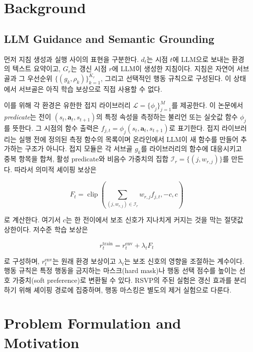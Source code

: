 \section{Background}

\subsection{LLM Guidance and Semantic Grounding}

먼저 지침 생성과 실행 사이의 표현을 구분한다. $d_t$는 시점 $t$에 LLM으로 보내는
환경의 텍스트 요약이고, $G_r$는 갱신 시점 $r$에 LLM이 생성한 지침이다. 지침은
자연어 서브골과 그 우선순위 $\{(g_k,\rho_k)\}_{k=1}^{K_r}$, 그리고 선택적인 행동
규칙으로 구성된다. 이 상태에서 서브골은 아직 학습 보상으로 직접 사용할 수 없다.

이를 위해 각 환경은 유한한 접지 라이브러리
$\mathcal L=\{\phi_j\}_{j=1}^{M}$를 제공한다. 이 논문에서 \emph{predicate}는
전이 $(s_t,\mathbf a_t,s_{t+1})$의 특정 속성을 측정하는 불리언 또는 실숫값 함수
$\phi_j$를 뜻한다. 그 시점의 함수 출력은
$f_{j,t}=\phi_j(s_t,\mathbf a_t,s_{t+1})$로 표기한다. 접지 라이브러리는 실행 전에
정의된 측정 함수의 목록이며 온라인에서 LLM이 새 함수를 만들어 추가하는 구조가 아니다.
접지 모듈은 각 서브골 $g_k$를 라이브러리의 함수에 대응시키고 중복 항목을
합쳐, 활성 predicate와 비음수 가중치의 집합
$\mathcal I_r=\{(j,w_{r,j})\}$를 만든다. 따라서 의미적 셰이핑 보상은

\begin{equation}
F_t=\operatorname{clip}\!\left(
  \sum_{(j,w_{r,j})\in\mathcal I_r}w_{r,j} f_{j,t},-c,c
\right)
\label{eq:shaping}
\end{equation}

로 계산한다. 여기서 $c$는 한 전이에서 보조 신호가 지나치게 커지는 것을 막는
절댓값 상한이다. 저수준 학습 보상은

\begin{equation}
r_t^{\mathrm{train}}=r_t^{\mathrm{env}}+\lambda_tF_t
\label{eq:reward}
\end{equation}

로 구성하며, $r_t^{\mathrm{env}}$는 원래 환경 보상이고 $\lambda_t$는 보조 신호의
영향을 조절하는 계수이다. 행동 규칙은 특정 행동을 금지하는 마스크(hard mask)나
행동 선택 점수를 높이는 선호 가중치(soft preference)로 변환될 수 있다. RSVP의
주된 실험은 갱신 효과를 분리하기 위해 셰이핑 경로에 집중하며, 행동 마스킹은 별도의
제거 실험으로 다룬다.

\section{Problem Formulation and Motivation}

